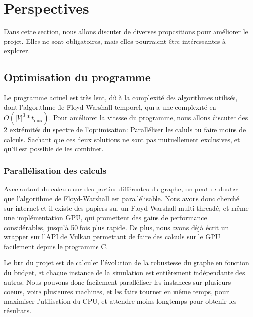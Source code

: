 \section{Perspectives}\label{sec:perspectives}
Dans cette section, nous allons discuter de diverses propositions pour améliorer le projet.
Elles ne sont obligatoires, mais elles pourraient être intéressantes à explorer.

\subsection{Optimisation du programme}\label{subsec:optimisation_du_programme}

Le programme actuel est très lent, dû à la complexité des algorithmes utilisés, dont l'algorithme de Floyd-Warshall temporel, qui a une complexité en $O(|V|^3*t_{\max})$.
Pour améliorer la vitesse du programme, nous allons discuter des 2 extrémités du spectre de l'optimisation: Paralléliser les caluls ou faire moins de calculs.
Sachant que ces deux solutions ne sont pas mutuellement exclusives, et qu'il est possible de les combiner.

\subsubsection{Parallélisation des calculs}\label{subsubsec:parallelisation}

\label{subsubsubsec:parallelisation_algorithme}
Avec autant de calculs sur des parties différentes du graphe, on peut se douter que l'algorithme de Floyd-Warshall est parallélisable.
Nous avons donc cherché sur internet et il existe des papiers sur un Floyd-Warshall multi-threadé\cite{Multithread_FW}, et même une implémentation GPU\cite{GPU_FW}, qui promettent des gains de performance considérables, jusqu'à 50 fois plus rapide.
De plus, nous avons déjà écrit un wrapper sur l'API de Vulkan permettant de faire des calculs sur le GPU facilement depuis le programme C.

\label{subsubsubsec:parallelisation_simulations} 
Le but du projet est de calculer l'évolution de la robustesse du graphe en fonction du budget, et chaque instance de la simulation est entièrement indépendante des autres.
Nous pouvons donc facilement paralléliser les instances sur plusieurs coeurs, voire plusieures machines, et les faire tourner en même temps, pour maximiser l'utilisation du CPU, et attendre moins longtemps pour obtenir les résultats.

